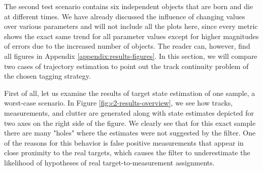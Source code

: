 
The second test scenario contains six independent objects that are born and die at different times. We have already discussed the influence of changing values over various parameters and will not include all the plots here, since every metric shows the exact same trend for all parameter values except for higher magnitudes of errors due to the increased number of objects. The reader can, however, find all figures in Appendix \ref{appendix:results-figures}. In this section, we will compare two cases of trajectory estimation to point out the track continuity problem of the chosen tagging strategy.

First of all, let us examine the results of target state estimation of one sample, a worst-case scenario. In Figure \ref{fig:c2-results-overview}, we see how tracks, measurements, and clutter are generated along with state estimates depicted for two axes on the right side of the figure. We clearly see that for this exact sample there are many "holes" where the estimates were not suggested by the filter. One of the reasons for this behavior is false positive measurements that appear in close proximity to the real targets, which causes the filter to underestimate the likelihood of hypotheses of real target-to-measurement assignments.

